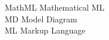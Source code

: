 \begin{tabbing}

    \>MathML \>\>Mathematical ML\\



    \>MD \>\>Model Diagram\\










    \>ML \>\>Markup Language\\








\end{tabbing}

